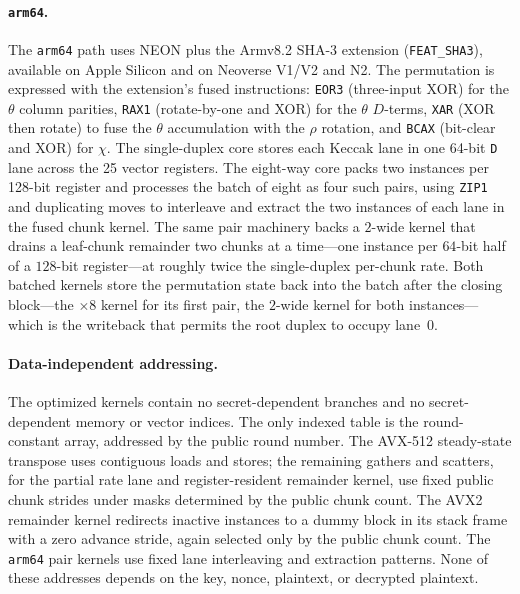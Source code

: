 \paragraph{\texttt{arm64}.}
The \texttt{arm64} path uses NEON plus the Armv8.2 SHA-3 extension
(\texttt{FEAT\_SHA3}), available on Apple Silicon and on Neoverse V1/V2 and N2.
The permutation is expressed with the extension's fused instructions:
\texttt{EOR3} (three-input XOR) for the $\theta$ column parities, \texttt{RAX1}
(rotate-by-one and XOR) for the $\theta$ $D$-terms, \texttt{XAR} (XOR then
rotate) to fuse the $\theta$ accumulation with the $\rho$ rotation, and
\texttt{BCAX} (bit-clear and XOR) for $\chi$. The single-duplex core stores
each Keccak lane in one 64-bit \texttt{D} lane across the 25 vector registers.
The eight-way core packs two instances per 128-bit register and processes the
batch of eight as four such pairs, using \texttt{ZIP1} and duplicating moves to
interleave and extract the two instances of each lane in the fused chunk kernel.
The same pair machinery backs a $2$-wide kernel that drains a leaf-chunk
remainder two chunks at a time---one instance per $64$-bit half of a $128$-bit
register---at roughly twice the single-duplex per-chunk rate. Both batched
kernels store the permutation state back into the batch after the closing
block---the $\times 8$ kernel for its first pair, the $2$-wide kernel for both
instances---which is the writeback that permits the root duplex to occupy
lane~$0$.

\paragraph{Data-independent addressing.}
The optimized kernels contain no secret-dependent branches and no
secret-dependent memory or vector indices. The only indexed table is the
round-constant array, addressed by the public round number. The AVX-512
steady-state transpose uses contiguous loads and stores; the remaining
gathers and scatters, for the partial rate lane and register-resident
remainder kernel, use fixed public chunk strides under masks determined by
the public chunk count. The AVX2 remainder kernel redirects inactive
instances to a dummy block in its stack frame with a zero advance stride,
again selected only by the public chunk count. The \texttt{arm64} pair
kernels use fixed lane interleaving and extraction patterns. None of these
addresses depends on the key, nonce, plaintext, or decrypted plaintext.
